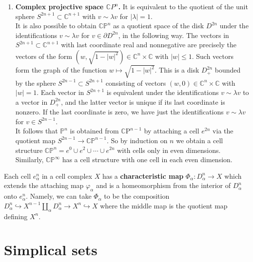 \begin{example}
\begin{enumerate}
        \item \textbf{Complex projective space $\mathbb{C} P^n$.} It is equivalent to the quotient of the unit sphere $S^{2 n+1} \subset \mathbb{C}^{n+1}$ with $v \sim \lambda v$ for $|\lambda|=1$. \\
        It is also possible to obtain $\mathbb{C P}^n$ as a quotient space of the disk $D^{2 n}$ under the identifications $v \sim \lambda v$ for $v \in \partial D^{2 n}$, in the following way. The vectors in $S^{2 n+1} \subset \mathbb{C}^{n+1}$ with last coordinate real and nonnegative are precisely the vectors of the form $\left(w, \sqrt{1-|w|^2}\right) \in \mathbb{C}^n \times \mathbb{C}$ with $|w| \leq 1$. Such vectors form the graph of the function $w \mapsto \sqrt{1-|w|^2}$. This is a disk $D_{+}^{2 n}$ bounded by the sphere $S^{2 n-1} \subset S^{2 n+1}$ consisting of vectors $(w, 0) \in \mathbb{C}^n \times \mathbb{C}$ with $|w|=1$. Each vector in $S^{2 n+1}$ is equivalent under the identifications $v \sim \lambda v$ to a vector in $D_{+}^{2 n}$, and the latter vector is unique if its last coordinate is nonzero. If the last coordinate is zero, we have just the identifications $v \sim \lambda v$ for $v \in S^{2 n-1}$.\\
        It follows that $\mathbb{P}^n$ is obtained from $\mathbb{C} \mathrm{P}^{n-1}$ by attaching a cell $e^{2 n}$ via the quotient map $S^{2 n-1} \rightarrow \mathbb{C P}^{n-1}$. So by induction on $n$ we obtain a cell structure $\mathbb{C P}^n=e^0 \cup e^2 \cup \cdots \cup e^{2 n}$ with cells only in even dimensions. Similarly, $\mathbb{C P}^{\infty}$ has a cell structure with one cell in each even dimension.
    \end{enumerate}
\end{example}

Each cell $e_\alpha^n$ in a cell complex $X$ has a \textbf{characteristic map} $\Phi_\alpha: D_\alpha^n \rightarrow X$ which extends the attaching map $\varphi_\alpha$ and is a homeomorphism from the interior of $D_\alpha^n$ onto $e_\alpha^n$. Namely, we can take $\Phi_\alpha$ to be the composition $D_\alpha^n \hookrightarrow X^{n-1} \coprod_\alpha D_\alpha^n \rightarrow X^n \hookrightarrow X$ where the middle map is the quotient map defining $X^n$. 





\section{Simplical sets}









